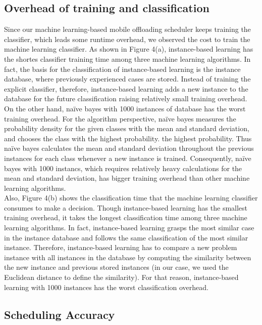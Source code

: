 \documentclass[10pt, conference, compsocconf]{IEEEtran}
\begin{document}
{\subsection{Overhead of training and classification}
%
Since our machine learning-based mobile offloading scheduler keeps
training the classifier, which leads some runtime overhead, we
observed the cost to train the machine learning classifier.
%
As shown in Figure 4(a), instance-based learning has the shortes
classifier training time among three machine learning algorithms.  
%
In fact, the basis for the classification of instance-based learning is
the instance database, where previously experienced cases are stored.
%
Instead of training the explicit classifier, therefore, instance-based
learning adds a new instance to the database for the future
classification raising relatively small training overhead.
%
On the other hand, na\"{i}ve bayes with 1000 instances of database has
the worst training overhead. 
%
For the algorithm perspective, na\"{i}ve bayes measures the
probability density for the given classes with the mean and standard
deviation, and chooses the class with the highest probability.
the highest probability.
%
Thus na\"{i}ve bayes calculates the mean and standard deviation
throughout the previous instances for each class whenever a new instance
is trained.
%
Consequently, na\"{i}ve bayes with 1000 instancs, which requires
relatively heavy calculations for the mean and standard deviation, has
bigger training overhead than other machine learning algorithms.\\
%
\indent Also, Figure 4(b) shows the classification time that the machine
learning classifier consumes to make a decision.
%
Though instance-based learning has the smallest training overhead, it
takes the longest classification time among three machine learning
algorithms.
%
In fact, instance-based learning grasps the most similar case in the
instance database and follows the same classification of the most
similar instance.
%
Therefore, instance-based learning has to compare a new problem instance
with all instances in the database by computing the similarity between
the new instance and previous stored instances (in our case, we used the
Euclidean distance to define the similarity).
%
For that reason, instance-based learning with 1000 instances has the
worst classification overhead. 
% 
\subsection{Scheduling Accuracy}
%

}
\end{document}
